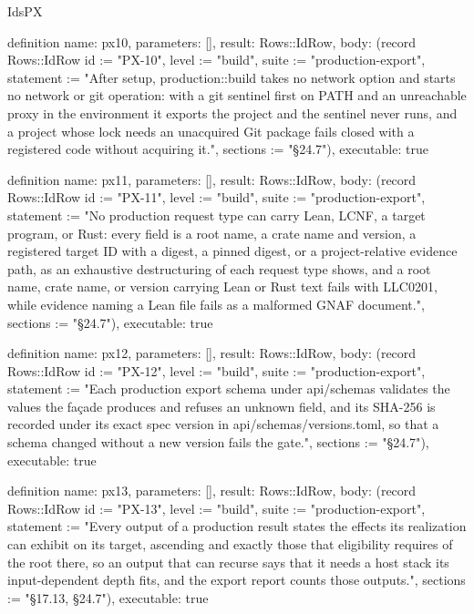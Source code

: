 \begin{lexlean}{IdsPX}
\begin{semanticmodule}
definition{
  name: px10,
  parameters: [],
  result: Rows::IdRow,
  body: (record Rows::IdRow {id := "PX-10", level := "build", suite := "production-export", statement := "After setup, production::build takes no network option and starts no network or git operation: with a git sentinel first on PATH and an unreachable proxy in the environment it exports the project and the sentinel never runs, and a project whose lock needs an unacquired Git package fails closed with a registered code without acquiring it.", sections := "§24.7"}),
  executable: true
}

definition{
  name: px11,
  parameters: [],
  result: Rows::IdRow,
  body: (record Rows::IdRow {id := "PX-11", level := "build", suite := "production-export", statement := "No production request type can carry Lean, LCNF, a target program, or Rust: every field is a root name, a crate name and version, a registered target ID with a digest, a pinned digest, or a project-relative evidence path, as an exhaustive destructuring of each request type shows, and a root name, crate name, or version carrying Lean or Rust text fails with LLC0201, while evidence naming a Lean file fails as a malformed GNAF document.", sections := "§24.7"}),
  executable: true
}

definition{
  name: px12,
  parameters: [],
  result: Rows::IdRow,
  body: (record Rows::IdRow {id := "PX-12", level := "build", suite := "production-export", statement := "Each production export schema under api/schemas validates the values the façade produces and refuses an unknown field, and its SHA-256 is recorded under its exact spec version in api/schemas/versions.toml, so that a schema changed without a new version fails the gate.", sections := "§24.7"}),
  executable: true
}

definition{
  name: px13,
  parameters: [],
  result: Rows::IdRow,
  body: (record Rows::IdRow {id := "PX-13", level := "build", suite := "production-export", statement := "Every output of a production result states the effects its realization can exhibit on its target, ascending and exactly those that eligibility requires of the root there, so an output that can recurse says that it needs a host stack its input-dependent depth fits, and the export report counts those outputs.", sections := "§17.13, §24.7"}),
  executable: true
}
\end{semanticmodule}
\end{lexlean}
